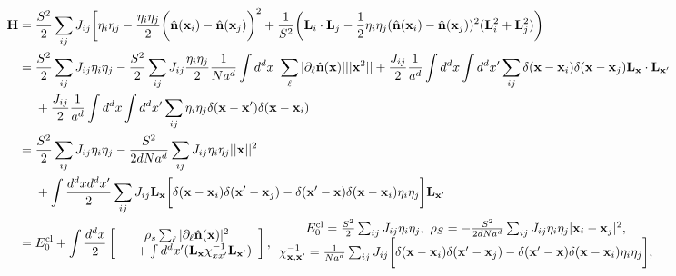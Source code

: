 \begin{equation}\begin{split}
    {\bf H}  &= \frac{S^2}{2}\sum_{ij} J_{ij} \bigg[\eta_i \eta_j - \frac{\eta_i \eta_j}{2} \bigg(\hat{{\bf n}}({\bf x}_i) - \hat{{\bf n}}({\bf x}_j)\bigg)^2 + \frac{1}{S^2} \bigg({\bf L}_i  \cdot {\bf L}_j - \frac{1}{2} \eta_i \eta_j (\hat{{\bf n}}({\bf x}_i) - \hat{{\bf n}}({\bf x}_j))^2 ({\bf L}_i^2 + {\bf L}_j^2) \bigg) \\
    &= \frac{S^2}{2} \sum_{ij} J_{ij} \eta_i \eta_j  - \frac{S^2}{2} \sum_{ij} J_{ij} \frac{\eta_i \eta_j}{2} \frac{1}{Na^d} \int d^d x \textnormal{ } \sum_{\ell} |\partial_{\ell} \hat{\bf n}({\bf x})| ||{\bf x}^2||
    + \frac{J_{ij}}{2} \frac{1}{a^d} \int d^d x \int d^d x' \sum_{ij} \delta({\bf x}-{\bf x}_i) \delta({\bf x}-{\bf x}_j) {\bf L}_{\bf x} \cdot {\bf L}_{\bf x'} \\
       & \textnormal{ } \textnormal{ } \textnormal{ } \textnormal{ } + \frac{J_{ij}}{2} \frac{1}{a^d} \int d^d x \int d^d x'\sum_{ij} \eta_i \eta_j \delta({\bf x-x'}) \delta({\bf x}-{\bf x}_i) \\
    &= \frac{S^2}{2} \sum_{ij} J_{ij} \eta_i \eta_j - \frac{S^2}{2d N a^d}  \sum_{ij} J_{ij} \eta_i \eta_j ||{\bf x}||^2 \\
       & \textnormal{ } \textnormal{ } \textnormal{ } \textnormal{ } + \int \frac{d^dx d^d x'}{2} \sum_{ij} J_{ij} {\bf L}_{\bf x} \bigg[\delta({\bf x-x}_i)\delta({\bf x'-x}_j) - \delta({\bf x'-x}) \delta({\bf x-x}_i) \eta_i \eta_j \bigg] {\bf L}_{{\bf x}'}\\
    &= E_{0}^{\textnormal{cl}} + \int \frac{d^d x}{2} \left[\begin{array}{c}
         \rho_s \sum_{\ell} |\partial_{\ell} \hat{{\bf n}}({\bf x})|^2 \\
         \textnormal{ } \textnormal{ } \textnormal{ } + \int d^d x' ({\bf L}_{\bf x }\chi_{xx'}^{-1} {\bf L}_{{\bf x}'})
    \end{array}\right], \begin{array}{cc}
         E_{0}^{\textnormal{cl}} = \frac{S^2}{2} \sum_{ij} J_{ij} \eta_i \eta_j, \textnormal{ }
         \rho_S = - \frac{S^2}{2dNa^d} \sum_{ij} J_{ij} \eta_i \eta_j |{\bf x}_i - {\bf x}_j|^2, \\
         \chi_{{\bf x,x'}}^{-1} = \frac{1}{Na^d} \sum_{ij} J_{ij} \bigg[\delta({\bf x-x}_i)\delta({\bf x'-x}_j) - \delta({\bf x'-x}) \delta({\bf x-x}_i) \eta_i \eta_j \bigg],
    \end{array}
\end{split}
\end{equation}

